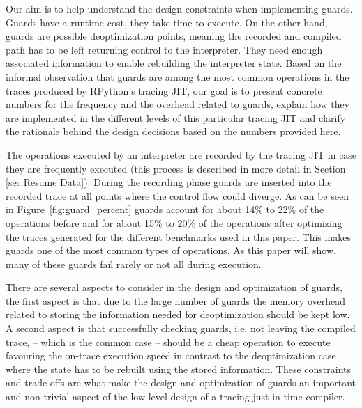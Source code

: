 \documentclass[10pt,preprint]{sigplanconf}
\begin{document}
Our aim is to help understand the design constraints when
implementing guards. Guards have a runtime cost, they take time to execute. On
the other hand, guards are possible deoptimization points, meaning the recorded
and compiled path has to be left returning control to the interpreter. They need
enough associated information to enable rebuilding the interpreter state.
Based on the informal observation that guards are among the most common
operations in the traces produced by RPython's tracing JIT, our
goal is to present concrete numbers for the frequency and the overhead related
to guards, explain how they are implemented in the different levels of this particular
tracing JIT and clarify the rationale behind the design decisions based on the
numbers provided here.

The operations executed by an interpreter are recorded by the tracing JIT in
case they are frequently executed (this process is described in more detail in
Section \ref{sec:Resume Data}). During the recording phase guards are
inserted into the recorded trace at all
points where the control flow could diverge. As can be seen in
Figure~\ref{fig:guard_percent} guards account for about 14\% to 22\% of the
operations before and for about 15\% to 20\% of the operations after
optimizing the traces generated for the different benchmarks used in this paper.
This makes guards one of the most common types of operations. As this paper will show, many of these guards
fail rarely or not all during execution.

There are several aspects to consider
in the design and optimization of guards, the first aspect is that due to the
large number of guards the memory overhead related to storing the information
needed for deoptimization should be kept low. A second aspect is that
successfully checking guards, i.e. not leaving the compiled trace, – which is
the common case – should be a cheap operation to execute favouring the on-trace
execution speed in contrast to the deoptimization case where the state has to
be rebuilt using the stored information. These constraints and trade-offs are
what make the design and optimization of guards an important and non-trivial
aspect of the low-level design of a tracing just-in-time compiler.
\end{document}
